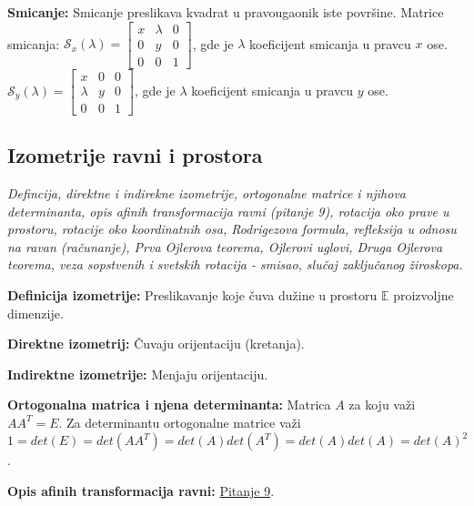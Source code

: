 \documentclass[12pt]{article}
\begin{document}
\textbf{Smicanje:} Smicanje preslikava kvadrat u pravougaonik iste površine.
Matrice smicanja:
$\mathcal{S}_x(\lambda)=\begin{bmatrix}
        x & \lambda & 0 \\
        0 & y       & 0 \\
        0 & 0       & 1
    \end{bmatrix}$, gde je $\lambda$ koeficijent smicanja u pravcu $x$ ose.\\
$\mathcal{S}_y(\lambda)=\begin{bmatrix}
        x       & 0 & 0 \\
        \lambda & y & 0 \\
        0       & 0 & 1
    \end{bmatrix}$, gde je $\lambda$ koeficijent smicanja u pravcu $y$ ose.

\subsection{Izometrije ravni i prostora}
\textit{Defincija, direktne i indirekne izometrije, ortogonalne matrice i
    njihova determinanta, opis afinih transformacija ravni (pitanje 9), rotacija
    oko prave u prostoru, rotacije oko koordinatnih osa, Rodrigezova formula,
    refleksija u odnosu na ravan (računanje), Prva Ojlerova teorema, Ojlerovi
    uglovi, Druga Ojlerova teorema, veza sopstvenih i svetskih rotacija - smisao,
    slučaj zaključanog žiroskopa.}
\par

\vspace*{1cm}

\textbf{Definicija izometrije:} Preslikavanje koje čuva dužine u prostoru
$\mathbb{E}$ proizvoljne dimenzije.
\par

\textbf{Direktne izometrij:} Čuvaju orijentaciju (kretanja).
\par

\textbf{Indirektne izometrije:} Menjaju orijentaciju.
\par

\textbf{Ortogonalna matrica i njena determinanta:} Matrica $A$ za koju važi
$AA^T=E$. Za determinantu ortogonalne matrice važi
$1=det(E)=det(AA^T)=det(A)det(A^T)=det(A)det(A)=det(A)^2$.
\par

\textbf{Opis afinih transformacija ravni:} \hyperref[subsec:pitanje_9]{Pitanje 9}.
\par
\end{document}
